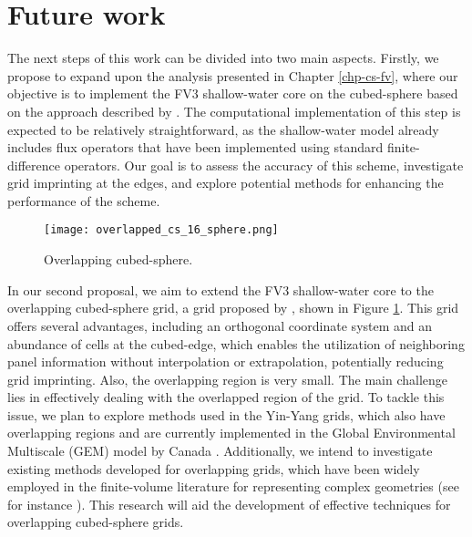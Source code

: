 \section{Future work}
The next steps of this work can be divided into two main aspects.
Firstly, we propose to expand upon the analysis presented in Chapter \ref{chp-cs-fv},
where our objective is to implement the FV3 shallow-water core on the cubed-sphere based on the approach described by \citet{lin:1997}.
The computational implementation of this step is expected to be relatively straightforward,
as the shallow-water model already includes flux operators that have been implemented using
standard finite-difference operators. Our goal is to assess the accuracy of this scheme,
investigate grid imprinting at the edges, and explore potential methods for enhancing the performance of the scheme.

\begin{figure}[!htb]
	\centering
	\texttt{[image: overlapped\_cs\_16\_sphere.png]}
	\caption{Overlapping cubed-sphere.\label{gridoverlaped}}
\end{figure}

In our second proposal, we aim to extend the FV3 shallow-water core to the overlapping cubed-sphere grid, a grid proposed by \citet{purser:2017}, shown in Figure \ref{gridoverlaped}.
This grid offers several advantages, including an orthogonal coordinate system and an abundance of cells at the cubed-edge,
which enables the utilization of neighboring panel information without interpolation or extrapolation, potentially reducing grid imprinting.
Also, the overlapping region is very small.
The main challenge lies in effectively dealing with the overlapped region of the grid. To tackle this issue, we plan to explore methods used in the Yin-Yang grids, which also have overlapping regions and are currently implemented in the Global Environmental Multiscale (GEM) model by Canada \citep{qaddouri:2011,husain:2019}.
Additionally, we intend to investigate existing methods developed for overlapping grids, which have been widely employed in the finite-volume literature for representing complex geometries
(see for instance \citet{hadzic:2005}).
This research will aid the development of effective techniques for overlapping cubed-sphere grids.